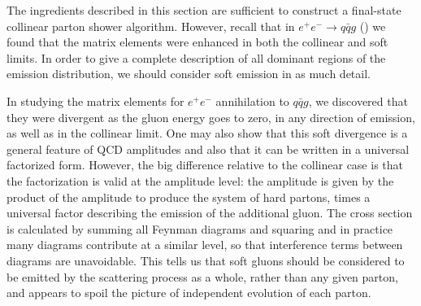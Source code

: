 The ingredients described in this section are sufficient to construct a
final-state collinear parton shower algorithm.  However, recall that in
\mbox{$e^+e^-\to q\bar{q}g$} () we found that the
matrix elements were enhanced in both the
collinear and soft limits.  In order to give a complete description of
all dominant regions of the emission distribution, we should consider
soft emission in as much detail.

\label{parton-showers:soft-gluons}
In studying the matrix elements for $e^+e^-$ annihilation to
$q\bar{q}g$, we discovered that they were divergent as the gluon energy
goes to zero, in any direction of emission, as well as in the collinear
limit.  One may also show that this soft divergence is a general feature
of QCD amplitudes and also that it can be written in a universal factorized
form.  However, the big difference relative to the collinear case is
that the factorization is valid at the amplitude level: the
amplitude is given by the product of the amplitude to produce the system
of hard partons, times a universal factor describing the emission of the
additional gluon.  The cross section is calculated by summing all
Feynman diagrams and squaring and in practice many diagrams contribute
at a similar level, so that interference terms between diagrams are
unavoidable.  This tells us that soft gluons should be considered to be
emitted by the scattering process as a whole, rather than any given
parton, and appears to spoil the picture of independent evolution of
each parton.

